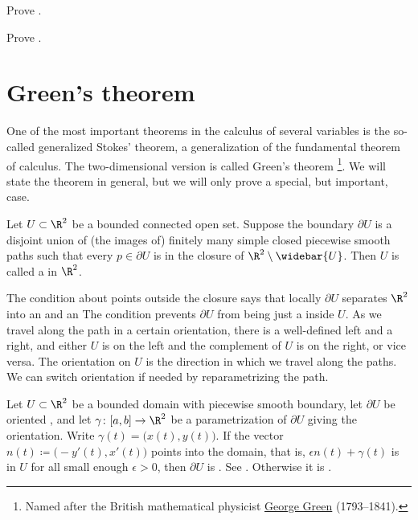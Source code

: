 \begin{exercise}
Prove .
\end{exercise}

\begin{exercise}
Prove .
\end{exercise}


\sectionnewpage
\section{Green's theorem}
\label{sec:mvgreenstheorem}


One of the most important theorems in the calculus of several variables is the
so-called generalized Stokes' theorem, a generalization of the
fundamental theorem of calculus.  The two-dimensional
version is called Green's theorem%
\footnote{Named after the British mathematical physicist
\href{https://en.wikipedia.org/wiki/George_Green_(mathematician)}{George Green}
(1793--1841).}.  We will state the theorem in general, but
we will only prove a special, but important, case.

\begin{defn}
Let $U \subset \R^2$ be a bounded connected open set.
Suppose the boundary
$\partial U$ is a disjoint union of (the images of) finitely many
simple closed piecewise smooth paths such that
every $p \in \partial U$ is in the closure of
$\R^2 \setminus \widebar{U}$.
Then $U$ is called a
\emph{}%
in $\R^2$.
\end{defn}

The condition about points outside the closure says that locally $\partial U$
separates $\R^2$ into an  and an   The condition prevents
$\partial U$ from being just a  inside $U$.  As we travel
along the path in a certain orientation,
there is a well-defined left and a right, and either $U$ is on the left
and the complement of $U$ is on the right, or vice versa.   
The orientation on $U$ is the direction in which we travel along the
paths.  We can switch orientation if needed by reparametrizing the
path.

\begin{defn}
Let $U \subset \R^2$ be a bounded domain with piecewise smooth boundary,
let $\partial U$ be oriented ,
and let $\gamma \colon [a,b] \to \R^2$ be a parametrization of $\partial U$
giving the orientation.  Write $\gamma(t) = \big(x(t),y(t)\bigr)$.
If the vector $n(t) \coloneqq \bigl(-y'(t),x'(t)\bigr)$ points into the domain,
that is, $\epsilon n(t) + \gamma(t)$ is in $U$ for all small enough
$\epsilon > 0$, then $\partial U$ is
\emph{}.  
See .
Otherwise it is \emph{}.
\end{defn}

